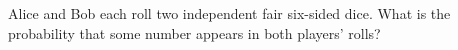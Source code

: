 Alice and Bob each roll two independent fair six-sided dice. What is the probability that some number appears in both players' rolls?
